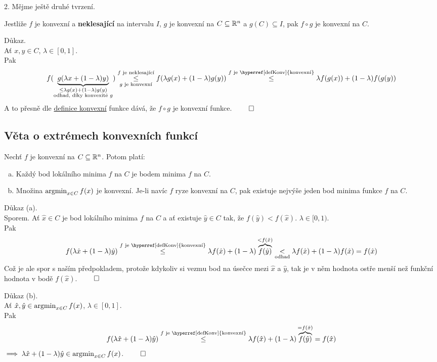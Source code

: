 2. Mějme ještě druhé tvrzení.

Jestliže $f$ je konvexní a \textbf{neklesající} na intervalu $I$, $g$ je konvexní na $C \subseteq \mathbb{R}^n$ a
$g(C) \subseteq I$, pak $f \circ g$ je konvexní na $C$.

Důkaz.\\
Ať $x, y \in C$, $\lambda \in [0,1]$.\\
Pak
\[
    f(\underbrace{g(\lambda x + (1-\lambda)y)}_{\substack{\leq \lambda g(x) + (1-\lambda)g(y) \\ \text{odhad, díky
    konvexitě }g }}) \underset{g \text{ je konvexní}}{\overset{f \text{ je neklesající}}{\leq}} f(\lambda g(x) +
    (1- \lambda) g(y)) \overset{f \text{ je \hyperref[defKonv]{konvexní}}}{\leq} \lambda f(g(x)) + (1-\lambda) f(g(y))
\]
A to přesně dle \hyperref[defKonv]{definice konvexní} funkce dává, že $f \circ g$ je konvexní funkce. $\qed$

\subsection{Věta o extrémech konvexních funkcí}
Nechť $f$ je konvexní na $C \subseteq \mathbb{R}^n$. Potom platí:
\begin{enumerate}[(a)]
    \item Každý bod lokálního minima $f$ na $C$ je bodem minima $f$ na $C$.
    \item Množina $\operatorname*{argmin}_{x \in C} f(x)$ je konvexní. Je-li navíc $f$ ryze konvexní na $C$, pak existuje nejvýše jeden
    bod minima funkce $f$ na $C$.
\end{enumerate}

Důkaz (a).\\
Sporem. Ať $\hat x \in C$ je bod lokálního minima $f$ na $C$ a ať existuje $\hat y \in C$ tak, že
$f(\hat y) < f(\hat x)$. $\lambda \in [0,1)$.\\
Pak
\[
    f(\lambda \hat x + (1-\lambda) \hat y) \overset{f \text{ je \hyperref[defKonv]{konvexní}}}{\leq}
    \lambda f(\hat x) + (1-\lambda) \overbrace{f(\hat y)}^{< f(\hat x)} \underset{\text{odhad}}{<}
    \lambda f(\hat x) + (1-\lambda) f(\hat x) = f(\hat x)
\]
Což je ale spor s naším předpokladem, protože kdykoliv si vezmu bod na úsečce mezi $\hat x$ a $\hat y$, tak je v něm
hodnota ostře menší než funkční hodnota v bodě $f(\hat x)$. $\qed$

Důkaz (b).\\
Ať $\hat x, \hat y \in \operatorname*{argmin}_{x \in C} f(x)$, $\lambda \in [0,1]$.\\
Pak
\[
    f(\lambda \hat x + (1-\lambda) \hat y) \overset{f \text{ je \hyperref[defKonv]{konvexní}}}\leq \lambda f(\hat x) +
    (1-\lambda) \overbrace{f(\hat y)}^{= f(\hat x)} = f(\hat x)
\]
$\implies \lambda \hat x + (1-\lambda) \hat y \in \operatorname*{argmin}_{x \in C} f(x)$. $\qed$

